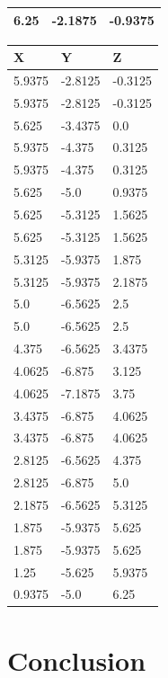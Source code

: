 \documentclass[12pt]{article}%
\begin{document}
\begin{table}[H]
\begin{tabular}{|l|l|l|}
            6.25 & -2.1875 & -0.9375 \\ \hline
        \end{tabular}
        \begin{tabular}{|l|l|l|}
            \hline
            X & Y & Z \\ \hline
            5.9375 & -2.8125 & -0.3125 \\ \hline
            5.9375 & -2.8125 & -0.3125 \\ \hline
            5.625 & -3.4375 & 0.0 \\ \hline
            5.9375 & -4.375 & 0.3125 \\ \hline
            5.9375 & -4.375 & 0.3125 \\ \hline
            5.625 & -5.0 & 0.9375 \\ \hline
            5.625 & -5.3125 & 1.5625 \\ \hline
            5.625 & -5.3125 & 1.5625 \\ \hline
            5.3125 & -5.9375 & 1.875 \\ \hline
            5.3125 & -5.9375 & 2.1875 \\ \hline
            5.0 & -6.5625 & 2.5 \\ \hline
            5.0 & -6.5625 & 2.5 \\ \hline
            4.375 & -6.5625 & 3.4375 \\ \hline
            4.0625 & -6.875 & 3.125 \\ \hline
            4.0625 & -7.1875 & 3.75 \\ \hline
            3.4375 & -6.875 & 4.0625 \\ \hline
            3.4375 & -6.875 & 4.0625 \\ \hline
            2.8125 & -6.5625 & 4.375 \\ \hline
            2.8125 & -6.875 & 5.0 \\ \hline
            2.1875 & -6.5625 & 5.3125 \\ \hline
            1.875 & -5.9375 & 5.625 \\ \hline
            1.875 & -5.9375 & 5.625 \\ \hline
            1.25 & -5.625 & 5.9375 \\ \hline
            0.9375 & -5.0 & 6.25 \\ \hline
        \end{tabular}
\end{table}



\section{Conclusion}\label{Sec: Conclusion}
\end{document}
